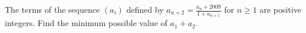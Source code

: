 The terms of the sequence $ (a_i)$ defined by $ a_{n + 2} = \frac {a_n + 2009} {1 + a_{n + 1}}$ for $ n \ge 1$ are positive integers. Find the minimum possible value of $ a_1 + a_2$.